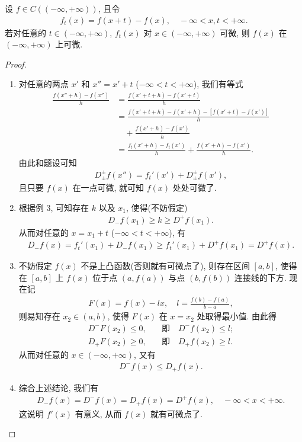 \documentclass[../../main.tex]{subfiles}%
\begin{document}
\begin{example}
设 $f\in C((-\infty,+\infty))$, 且令
\begin{align*}
f_t(x) = f(x+t)-f(x), \quad -\infty < x, t < +\infty.
\end{align*}
若对任意的 $t\in(-\infty,+\infty)$, $f_t(x)$ 对 $x\in(-\infty,+\infty)$ 可微, 则 $f(x)$ 在 $(-\infty,+\infty)$ 上可微.
\end{example}
\begin{proof}
\begin{enumerate}[(1)]
\item 对任意的两点 $x'$ 和 $x''=x'+t$ ($-\infty<t<+\infty$), 我们有等式
\begin{align*}
\frac{f(x''+h)-f(x'')}{h} &= \frac{f(x'+t+h)-f(x'+t)}{h} \\
&= \frac{f(x'+t+h)-f(x'+h)-[f(x'+t)-f(x')]}{h} \\
&\quad + \frac{f(x'+h)-f(x')}{h} \\
&= \frac{f_t(x'+h)-f_t(x')}{h} + \frac{f(x'+h)-f(x')}{h}.
\end{align*}
由此和题设可知
\begin{align*}
D^\pm_\pm f(x'') = f_t'(x') + D^\pm_\pm f(x'),
\end{align*}
且只要 $f(x)$ 在一点可微, 就可知 $f(x)$ 处处可微了.

\item 根据例 3, 可知存在 $k$ 以及 $x_1$, 使得(不妨假定)
\begin{align*}
D_-f(x_1) \geqslant k \geqslant D^+f(x_1).
\end{align*}
从而对任意的 $x=x_1+t$ ($-\infty<t<+\infty$), 有
\begin{align*}
D_-f(x) = f_t'(x_1) + D_-f(x_1) \geqslant f_t'(x_1) + D^+f(x_1) = D^+f(x).
\end{align*}

\item 不妨假定 $f(x)$ 不是上凸函数(否则就有可微点了), 则存在区间 $[a,b]$, 使得在 $[a,b]$ 上 $f(x)$ 位于点 $(a,f(a))$ 与点 $(b,f(b))$ 连接线的下方. 现在记
\begin{align*}
F(x) = f(x)-lx, \quad l = \frac{f(b)-f(a)}{b-a},
\end{align*}
则易知存在 $x_2\in(a,b)$, 使得 $F(x)$ 在 $x=x_2$ 处取得最小值. 由此得
\begin{align*}
D^-F(x_2) \leqslant 0, \quad &\text{即} \quad D^-f(x_2) \leqslant l; \\
D_+F(x_2) \geqslant 0, \quad &\text{即} \quad D_+f(x_2) \geqslant l.
\end{align*}
从而对任意的 $x\in(-\infty,+\infty)$, 又有
\begin{align*}
D^-f(x) \leqslant D_+f(x).
\end{align*}

\item 综合上述结论, 我们有
\begin{align*}
D_-f(x) = D^-f(x) = D_+f(x) = D^+f(x), \quad -\infty < x < +\infty.
\end{align*}
这说明 $f'(x)$ 有意义, 从而 $f(x)$ 就有可微点了.

\end{enumerate}

\end{proof}
\end{document}
